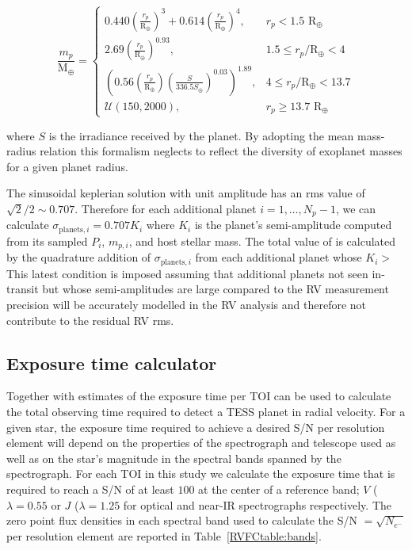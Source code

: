 \begin{equation}
  \frac{m_p}{\text{M}_{\oplus}} = 
  \begin{cases}
    0.440 \left(\frac{r_p}{\text{R}_{\oplus}} \right)^3 + 0.614 \left( \frac{r_p}{\text{R}_{\oplus}} \right)^4, & r_p < 1.5 \text{ R}_{\oplus} \\
    2.69 \left( \frac{r_p}{\text{R}_{\oplus}} \right)^{0.93}, & 1.5 \leq r_p/\text{R}_{\oplus} < 4 \\
    \left( 0.56 \left( \frac{r_p}{\text{R}_{\oplus}} \right) \left( \frac{S}{336.5 S_{\oplus}} \right)^{0.03} \right)^{1.89}, & 4 \leq r_p/\text{R}_{\oplus} < 13.7 \\  
    \mathcal{U}(150,2000), & r_p \geq 13.7 \text{ R}_{\oplus}
  \end{cases}
  \label{RVFCeq:MR}
\end{equation}

\noindent where $S$ is the irradiance received by the planet. By adopting the mean mass-radius relation this
formalism neglects to reflect the diversity of exoplanet masses for a given planet radius.  

The sinusoidal keplerian solution with unit amplitude has an rms value of $\sqrt{2}/2 \sim 0.707$.
Therefore for each additional planet $i=1,\dots,N_p-1$,
we can calculate $\sigma_{\text{planets},i}=0.707K_i$ where $K_i$ is the planet's semi-amplitude computed
from its sampled $P_i$, $m_{p,i}$, and host stellar mass.
The total value of \sigplan{}
is calculated by the quadrature addition of $\sigma_{\text{planets},i}$ from each additional planet whose
$K_i >$  This latest condition is imposed assuming that additional planets not seen in-transit
but whose semi-amplitudes are large compared to the RV measurement precision will be accurately
modelled in the RV analysis and therefore not contribute to the residual RV rms.

\subsection{Exposure time calculator} \label{RVFCsect:etc}
Together with estimates of \nrv{,}
the exposure time \texp{} per TOI can be used to calculate the total observing
time required to detect a TESS planet in radial velocity. For a given star, the exposure time required to
achieve a desired S/N per resolution element will depend on the properties of the spectrograph and telescope
used as well as on the star's magnitude in the spectral bands spanned by the spectrograph.
For each TOI in this study we calculate the exposure time that is required to reach a S/N of at least $100$
at the center of a reference band; $V$ ($\lambda=0.55$ \micron{)} or $J$ ($\lambda=1.25$ \micron{)} for optical
and near-IR spectrographs respectively. The zero point flux densities in each spectral band used to
calculate the S/N $=\sqrt{N_{e^-}}$ per resolution element are reported in Table~\ref{RVFCtable:bands}.


